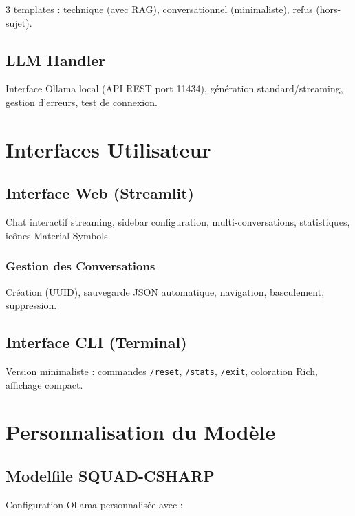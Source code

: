 \documentclass[12pt,a4paper]{report}
\begin{document}
3 templates : technique (avec RAG), conversationnel (minimaliste), refus (hors-sujet).

\subsection{LLM Handler}

Interface Ollama local (API REST port 11434), génération standard/streaming, gestion d'erreurs, test de connexion.

\section{Interfaces Utilisateur}

\subsection{Interface Web (Streamlit)}

Chat interactif streaming, sidebar configuration, multi-conversations, statistiques, icônes Material Symbols.

\subsubsection{Gestion des Conversations}

Création (UUID), sauvegarde JSON automatique, navigation, basculement, suppression.

\subsection{Interface CLI (Terminal)}

Version minimaliste : commandes \texttt{/reset}, \texttt{/stats}, \texttt{/exit}, coloration Rich, affichage compact.

\section{Personnalisation du Modèle}

\subsection{Modelfile SQUAD-CSHARP}

Configuration Ollama personnalisée avec :
\end{document}
